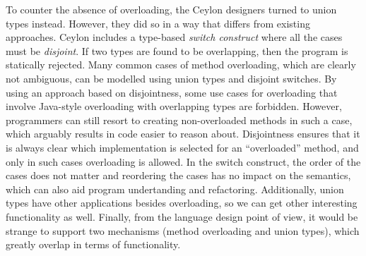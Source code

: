 To counter the absence of overloading, the Ceylon designers turned to
union types instead. However, they did so in a way that differs from
existing approaches. Ceylon includes a type-based 
\emph{switch construct} where all the cases must be \emph{disjoint}.  If
two types are found to be overlapping, then the program is statically
rejected. Many common cases of method overloading, which are clearly
not ambiguous, can be modelled using union types and disjoint switches.
By using an approach based on disjointness, some use cases for
overloading that involve Java-style overloading with
overlapping types are forbidden. However,
programmers can still resort to creating non-overloaded methods in
such a case, which arguably results in code easier to reason about.
Disjointness ensures that it is always
clear which implementation is selected for an ``overloaded'' method,
and only in such cases overloading is allowed.
In the switch construct,
the order of the cases does not matter and reordering the cases has no
impact on the semantics, which can also aid program undertanding and
refactoring.
Additionally, union types have other applications besides overloading,
so we can get other interesting functionality as well. Finally, from
the language design point of view, it would be strange to support two
mechanisms (method overloading and union types), which greatly overlap
in terms of functionality.

